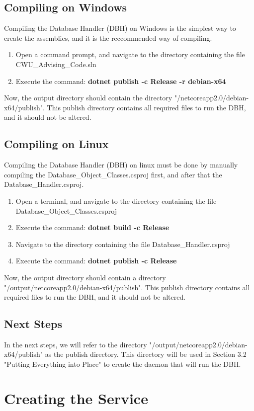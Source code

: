 \documentclass[letterpaper]{article}
\begin{document}
	\subsection{Compiling on Windows}
	Compiling the Database Handler (DBH) on Windows is the simplest way to create the assemblies, and it is the reccommended way of compiling. 
	\begin{enumerate}
		\item Open a command prompt, and navigate to the directory containing the file CWU\_Advising\_Code.sln
		\item Execute the command: \textbf{dotnet publish -c Release -r debian-x64 }
	\end{enumerate}
	Now, the output directory should contain the directory "/netcoreapp2.0/debian-x64/publish". This publish directory contains all required files to run the DBH, and it should not be altered.
	\subsection{Compiling on Linux}
	Compiling the Database Handler (DBH) on linux must be done by manually compiling the Database\_Object\_Classes.csproj first, and after that the Database\_Handler.csproj. 
	\begin{enumerate}
		\item Open a terminal, and navigate to the directory containing the file Database\_Object\_Classes.csproj
		\item Execute the command: \textbf{dotnet build -c Release}
		\item Navigate to the directory containing the file Database\_Handler.csproj
		\item Execute the command: \textbf{dotnet publish -c Release}
	\end{enumerate}
	Now, the output directory should contain a directory "/output/netcoreapp2.0/debian-x64/publish". This publish directory contains all required files to run the DBH, and it should not be altered.
	
	\subsection{Next Steps}
	In the next steps, we will refer to the directory "/output/netcoreapp2.0/debian-x64/publish" as the publish directory. This directory will be used in Section 3.2 "Putting Everything into Place" to create the daemon that will run the DBH.
	
	\section{Creating the Service}
	
\end{document}
